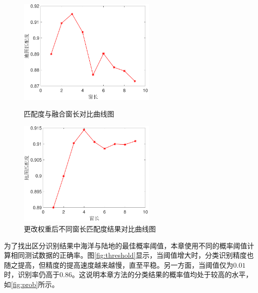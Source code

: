 \begin{figure}[H]
	\centering
	\begin{minipage}{7cm}
		\centering
		\includegraphics[width=6.67cm]{figures/othr/window}
		\caption{匹配度与融合窗长对比曲线图}
		\label{fig:window}
	\end{minipage}
	\hspace{10pt}
	\begin{minipage}{7cm}
		\centering
		\includegraphics[width=6.67cm]{figures/othr/weighted_window}
		\caption{更改权重后不同窗长匹配度结果对比曲线图}
		\label{fig:weighted_window}
	\end{minipage}

\end{figure}


为了找出区分识别结果中海洋与陆地的最佳概率阈值，本章使用不同的概率阈值计算相同测试数据的正确率。图\ref{fig:threshold}显示，当阈值增大时，分类识别精度也随之提高，但精度的提高速度越来越慢，直至平稳。另一方面，当阈值仅为$0.01$时，识别率仍高于$0.86$。这说明本章方法的分类结果的概率值均处于较高的水平，如\ref{fig:prob}所示。

